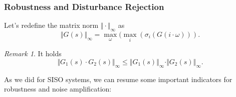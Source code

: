 \documentclass[a4paper,12 pt]{article}
\numberwithin{equation}{section}
\theoremstyle{definition}
\theoremstyle{remark}
\newtheorem*{bmk}{Remark}
\theoremstyle{definition}
\theoremstyle{definition}
\theoremstyle{definition}
\theoremstyle{remark}
\begin{document}
\subsubsection{Robustness and Disturbance Rejection}
Let's redefine the matrix norm $\Vert\cdot\Vert_\infty$ as
\begin{equation}
\Vert G(s)\Vert_\infty = \max\limits_{\omega}(\max\limits_{i}( \sigma_i(G(i\cdot \omega))).
\end{equation}
\begin{bmk}
It holds
\begin{equation}
\Vert G_1(s)\cdot G_2(s)\Vert_\infty \leq \Vert G_1(s)\Vert_\infty \cdot \Vert G_2(s)\Vert_\infty .
\end{equation}
\end{bmk}
As we did for SISO systems, we can resume some important indicators for robustness and noise amplification:
\end{document}
